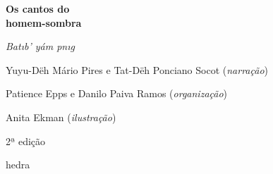 




\begingroup\thispagestyle{empty}\vspace*{.05\textheight} 

              {\formular
              \huge
              \noindent
              \textbf{Os cantos do\\ homem-sombra}

              \vspace{0.3em}
              
              \large
              \noindent
              \textit{Bat\i{}b’ yám p\I{}n\i{}g}
              }              
              \vspace{10em}

              
              {\small\noindent Yuyu-Dëh Mário Pires e Tat-Dëh Ponciano Socot (\textit{narração})}

              {\small\noindent Patience Epps e Danilo Paiva Ramos (\textit{organização})}

              {\small\noindent Anita Ekman (\textit{ilustração})}

              \bigskip

              \noindent
              {\small\noindent 2ª edição}

              \vfill

              \newfontfamily{}
              {\noindent\fontsize{30}{40}\selectfont \timesnewroman hedra}



\endgroup
\pagebreak

